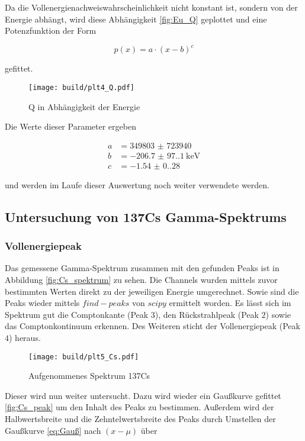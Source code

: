 Da die Vollenergienachweiswahrscheinlichkeit nicht konstant ist, sondern von
der Energie abhängt, wird diese Abhängigkeit \eqref{fig:Eu_Q} geplottet und
eine Potenzfunktion der Form

\begin{equation}
	p(x)=a \cdot (x-b)^c
\end{equation}

gefittet.

\begin{figure}[H]
	\centering
	\texttt{[image: build/plt4\_Q.pdf]}
	\caption{Q in Abhängigkeit der Energie}
	\label{fig:Eu_Q}
\end{figure}

Die Werte dieser Parameter ergeben

\begin{align*}
	a & =\num{349803(723940)}         \\
	b & =\qty{-206.7(97.1)}{\kilo\eV} \\
	c & =\num{-1.54(0.28)}
\end{align*}

und werden im Laufe dieser Auswertung noch weiter verwendete werden.

\subsection{Untersuchung von 137Cs Gamma-Spektrums}
\subsubsection{Vollenergiepeak}
Das gemessene Gamma-Spektrum zusammen mit den gefunden Peaks ist in Abbildung
\eqref{fig:Cs_spektrum} zu sehen. Die Channels wurden mittels zuvor bestimmten
Werten direkt zu der jeweiligen Energie umgerechnet. Sowie sind die Peaks
wieder mittels $find-peaks$ von $scipy$ \cite{scipy} ermittelt worden. Es lässt
sich im Spektrum gut die Comptonkante (Peak $3$), den Rückstrahlpeak (Peak $2$)
sowie das Comptonkontinuum erkennen. Des Weiteren sticht der Vollenergiepeak
(Peak $4$) heraus.

\begin{figure}[H]
	\centering
	\texttt{[image: build/plt5\_Cs.pdf]}
	\caption{Aufgenommenes Spektrum 137Cs}
	\label{fig:Cs_spektrum}
\end{figure}

Dieser wird nun weiter untersucht. Dazu wird wieder ein Gaußkurve gefittet
\eqref{fig:Cs_peak} um den Inhalt des Peaks zu bestimmen. Außerdem wird der
Halbwertsbreite und die Zehntelwertsbreite des Peaks durch Umstellen der
Gaußkurve \eqref{eq:Gauß} nach $(x-\mu)$ über

